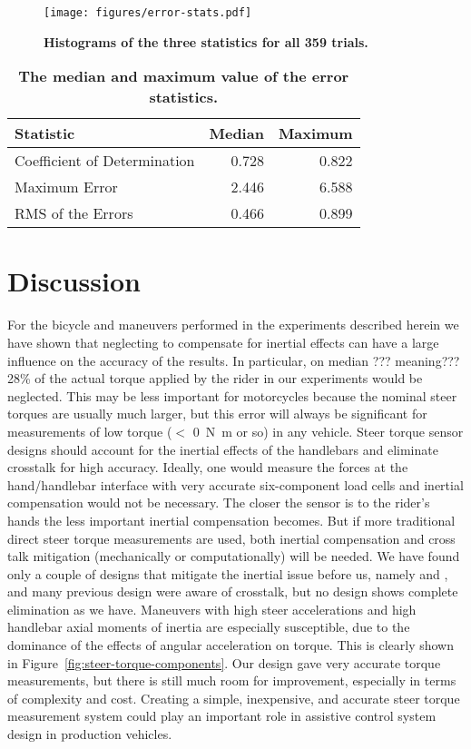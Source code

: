 \documentclass[10pt]{article}
\begin{document}
\begin{figure}
  \centering
  \texttt{[image: figures/error-stats.pdf]}
  \caption{{\bf Histograms of the three statistics for all 359 trials.}}
  \label{fig:error-stats}
\end{figure}

\begin{table}
  \caption{{\bf The median and maximum value of the error statistics.}}
  \centering
  \begin{tabular}{lrr}
    \hline
    Statistic                    & Median   & Maximum \\
    \hline
    Coefficient of Determination & 0.728 & 0.822 \\
    Maximum Error                & 2.446 & 6.588 \\
    RMS of the Errors            & 0.466 & 0.899
  \end{tabular}
  \label{tab:medians}
\end{table}

\section*{Discussion}

For the bicycle and maneuvers performed in the experiments described herein we
have shown that neglecting to compensate for inertial effects can have a large
influence on the accuracy of the results. In particular, on median ???
meaning??? 28\% of the actual torque applied by the rider in our experiments
would be neglected. This may be less important for motorcycles because the
nominal steer torques are usually much larger, but this error will always be
significant for measurements of low torque ($<$ \SI{0}{\newton\meter} or so) in any vehicle.
Steer torque sensor designs should account for the inertial effects of the
handlebars and eliminate crosstalk for high accuracy. Ideally, one would
measure the forces at the hand/handlebar interface with very accurate
six-component load cells and inertial compensation would not be necessary. The
closer the sensor is to the rider's hands the less important inertial
compensation becomes. But if more traditional direct steer torque measurements
are used, both inertial compensation and cross talk mitigation (mechanically or
computationally) will be needed. We have found only a couple of designs that
mitigate the inertial issue before us, namely \cite{Evertse2010} and
\cite{Iuchi2006}, and many previous design were aware of crosstalk, but no
design shows complete elimination as we have. Maneuvers with high steer
accelerations and high handlebar axial moments of inertia are especially
susceptible, due to the dominance of the effects of angular acceleration on
torque. This is clearly shown in Figure~\ref{fig:steer-torque-components}. Our
design gave very accurate torque measurements, but there is still much room for
improvement, especially in terms of complexity and cost. Creating a simple,
inexpensive, and accurate steer torque measurement system could play an
important role in assistive control system design in production vehicles.
\end{document}
